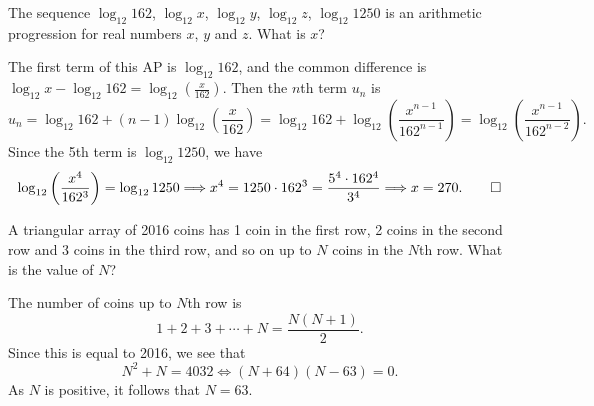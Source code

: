 \begin{question}
    The sequence $\log_{12}162$, $\log_{12}x$, $\log_{12}y$, $\log_{12}z$,
    $\log_{12}1250$ is an arithmetic progression for real numbers $x$, $y$ and
    $z$. What is $x$?
\end{question}
\begin{solution}
    The first term of this AP is $\log_{12} 162$, and the common difference is
    $\log_{12} x - \log_{12} 162 = \log_{12} \left( \frac{x}{162} \right)$.
    Then the $n$th term $u_n$ is 
    \[ u_n = \log_{12} 162 + (n - 1) \log_{12} \left( \frac{x}{162} \right) =
    \log_{12} 162 + \log_{12} \left( \frac{x^{n - 1}}{162^{n - 1}} \right) =
    \log_{12} \left( \frac{x^{n - 1}}{162^{n - 2}} \right). \]
    Since the 5th term is $\log_{12} 1250$, we have
    \[ \log_{12} \left( \frac{x^4}{162^3} \right) = \log_{12} 1250
    \Longrightarrow x^4 = 1250 \cdot 162^3 = \frac{5^4 \cdot 162^4}{3^4}
    \Longrightarrow x = 270. \qedhere \]
\end{solution}

\begin{question}
    A triangular array of 2016 coins has 1 coin in the first row, 2 coins in
    the second row and 3 coins in the third row, and so on up to $N$ coins in
    the $N$th row. What is the value of $N$?
\end{question}
\begin{solution}
    The number of coins up to $N$th row is 
    \[ 1 + 2 + 3 + \cdots + N = \frac{N(N + 1)}{2}. \]
    Since this is equal to 2016, we see that 
    \[ N^2 + N = 4032 \Longleftrightarrow (N + 64)(N - 63) = 0. \]
    As $N$ is positive, it follows that $N = 63$.
\end{solution}

